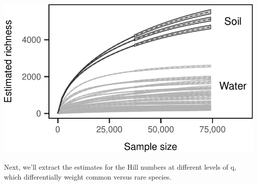 \documentclass[]{article}
\begin{document}
\begin{center}\includegraphics{ReservoirGradient_files/figure-latex/rare_extrap_plot-1} \end{center}

Next, we'll extract the estimates for the Hill numbers at different
levels of q, which differentially weight common versus rare species.
\end{document}
